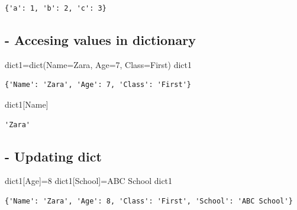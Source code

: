 \documentclass[
  a4paper,
  DIV=11,
  numbers=noendperiod]{scrreprt}
\newenvironment{Shaded}{\begin{snugshade}}{\end{snugshade}}
\newcommand{\BuiltInTok}[1]{\textcolor[rgb]{0.00,0.23,0.31}{#1}}
\newcommand{\DecValTok}[1]{\textcolor[rgb]{0.68,0.00,0.00}{#1}}
\newcommand{\NormalTok}[1]{\textcolor[rgb]{0.00,0.23,0.31}{#1}}
\newcommand{\OperatorTok}[1]{\textcolor[rgb]{0.37,0.37,0.37}{#1}}
\newcommand{\StringTok}[1]{\textcolor[rgb]{0.13,0.47,0.30}{#1}}
\begin{document}
\begin{verbatim}
{'a': 1, 'b': 2, 'c': 3}
\end{verbatim}

\subsection{- Accesing values in
dictionary}\label{accesing-values-in-dictionary}

\begin{Shaded}
\begin{Highlighting}[]
\NormalTok{dict1}\OperatorTok{=}\BuiltInTok{dict}\NormalTok{(Name}\OperatorTok{=}\StringTok{\textquotesingle{}Zara\textquotesingle{}}\NormalTok{, Age}\OperatorTok{=}\DecValTok{7}\NormalTok{, Class}\OperatorTok{=}\StringTok{\textquotesingle{}First\textquotesingle{}}\NormalTok{)}
\NormalTok{dict1}
\end{Highlighting}
\end{Shaded}

\begin{verbatim}
{'Name': 'Zara', 'Age': 7, 'Class': 'First'}
\end{verbatim}

\begin{Shaded}
\begin{Highlighting}[]
\NormalTok{dict1[}\StringTok{\textquotesingle{}Name\textquotesingle{}}\NormalTok{]}
\end{Highlighting}
\end{Shaded}

\begin{verbatim}
'Zara'
\end{verbatim}

\subsection{- Updating dict}\label{updating-dict}

\begin{Shaded}
\begin{Highlighting}[]
\NormalTok{dict1[}\StringTok{\textquotesingle{}Age\textquotesingle{}}\NormalTok{]}\OperatorTok{=}\DecValTok{8}
\NormalTok{dict1[}\StringTok{\textquotesingle{}School\textquotesingle{}}\NormalTok{]}\OperatorTok{=}\StringTok{\textquotesingle{}ABC School\textquotesingle{}}
\NormalTok{dict1}
\end{Highlighting}
\end{Shaded}

\begin{verbatim}
{'Name': 'Zara', 'Age': 8, 'Class': 'First', 'School': 'ABC School'}
\end{verbatim}
\end{document}
